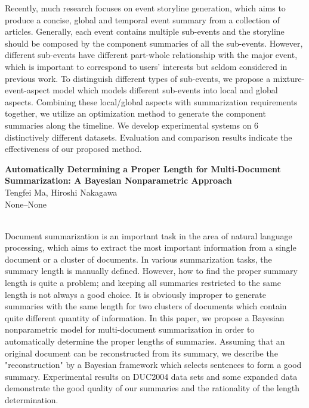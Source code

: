 \documentclass[twoside,makeidx]{book}
\renewcommand{\normalsize}{\fontsize{8}{9}\selectfont}
\renewcommand{\small}{\fontsize{7}{8}\selectfont}
\begin{document}
{\small Recently, much research focuses on event storyline generation, which aims to produce a concise, global and temporal event summary from a collection of articles. Generally, each event contains multiple sub-events and the storyline should be composed by the component summaries of all the sub-events. However, different sub-events have different part-whole relationship with the major event, which is important to correspond to users' interests but seldom considered in previous work. To distinguish different types of sub-events, we propose a mixture-event-aspect model which models different sub-events into local and global aspects. Combining these local/global aspects with summarization requirements together, we utilize an optimization method to generate the component summaries along the timeline. We develop experimental systems on 6 distinctively different datasets. Evaluation and comparison results indicate the effectiveness of our proposed method.}
\par\vspace{2em}\noindent%
\begin{minipage}{\linewidth}%
\begin{center}
\textbf{\normalsize Automatically Determining a Proper Length for Multi-Document Summarization: A Bayesian Nonparametric Approach}\\
\normalsize  Tengfei Ma,  Hiroshi Nakagawa\\
{\small None--None}\\
\end{center}
\end{minipage}\\[0.5em]
\nopagebreak%
\noindent%
{\small Document summarization is an important task in the area of natural language processing, which aims to extract the most important information from a single document or a cluster of documents. In various summarization tasks, the summary length is manually defined. However, how to find the proper summary length is quite a problem; and keeping all summaries restricted to the same length is not always a good choice. It is obviously improper to generate summaries with the same length for two clusters of documents which contain quite different quantity of information. In this paper, we propose a Bayesian nonparametric model for multi-document summarization in order to automatically determine the proper lengths of summaries. Assuming that an original document can be reconstructed from its summary, we describe the "reconstruction" by a Bayesian framework which selects sentences to form a good summary. Experimental results on DUC2004 data sets and some expanded data demonstrate the good quality of our summaries and the rationality of the length determination.}
\end{document}
